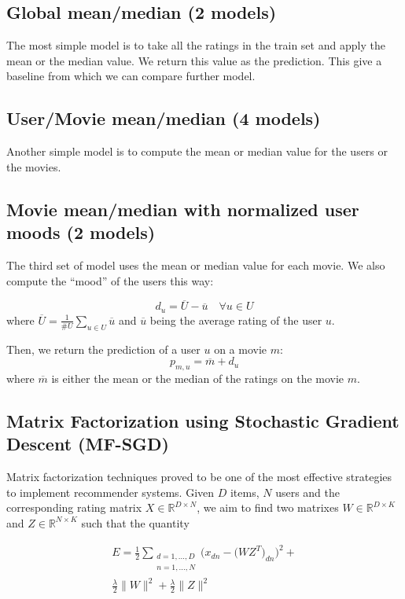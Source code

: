 \documentclass[10pt,conference,compsocconf]{IEEEtran}
\begin{document}
\subsection{Global mean/median (2 models)}

The most simple model is to take all the ratings in the train set and apply the mean or the median value. We return this value as the prediction. This give a baseline from which we can compare further model.

\subsection{User/Movie mean/median (4 models)}

Another simple model is to compute the mean or median value for the users or the movies.

\subsection{Movie mean/median with normalized user moods (2 models)}

The third set of model uses the mean or median value for each movie. We also compute the ``mood'' of the users this way:

\begin{equation}
 d_u = \overline{U} - \overline{u} \quad \forall u\in U
\end{equation}
where $\overline{U} = \frac{1}{\#U} \sum_{u\in U} \overline{u}$ and $\overline{u}$ being the average rating of the user $u$.

Then, we return the prediction of a user $u$ on a movie $m$:
\begin{equation}
 p_{m,u} = \overline{m} + d_u
\end{equation}
where $\overline{m}$ is either the mean or the median of the ratings on the movie $m$.

\subsection{Matrix Factorization using Stochastic Gradient Descent (MF-SGD)}
\label{sec:mf-sgd}
Matrix factorization techniques proved to be one of the most effective strategies to implement 
recommender systems. Given $D$ items, $N$ users and the corresponding rating matrix 
$X \in \mathbb{R}^{D \times N}$, we aim to find two matrixes $W \in \mathbb{R}^{D \times K}$ and $Z
\in \mathbb{R}^{N \times K}$ such that the quantity 

\begin{multline}
\label{eq:functional}
E = \frac{1}{2} \sum_{\substack{d=1,...,D \\n=1,...,N}} 
\bigg( x_{dn} - \big( WZ^T \big)_{dn} \bigg) ^2 + \\ 
\frac{\lambda}{2}\|W\|^2 + \frac{\lambda}{2}\|Z\|^2
\end{multline} 
\end{document}
